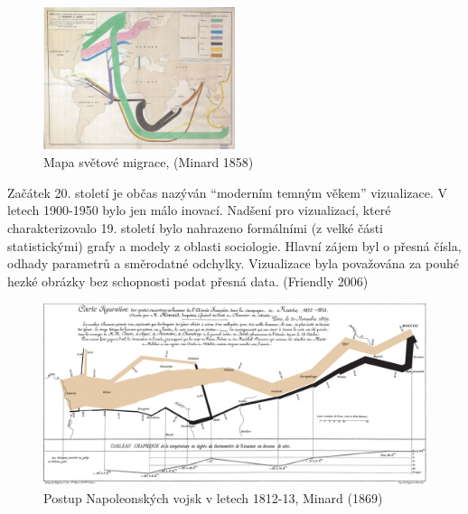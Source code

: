 \documentclass[12pt,]{article}
\begin{document}
\begin{figure}
    \centering
    \vspace*{-20pt}
    \includegraphics[width=0.5\textwidth]{fig/minard_flow_map.jpg}
    \vspace{-5pt}
    \caption{Mapa světové migrace, (Minard 1858)}
    \label{fig:ch1.2}
\end{figure}

\vspace{2.5pt} \qquad Začátek 20. století je občas nazýván
\enquote{moderním temným věkem} vizualizace. V letech 1900-1950 bylo jen
málo inovací. Nadšení pro vizualizací, které charakterizovalo 19.
století bylo nahrazeno formálními (z velké části statistickými) grafy a
modely z oblasti sociologie. Hlavní zájem byl o přesná čísla, odhady
parametrů a směrodatné odchylky. Vizualizace byla považována za pouhé
hezké obrázky bez schopnosti podat přesná data. (Friendly 2006)

\begin{figure}[H]
\centering
\includegraphics[width = \textwidth]{fig/Minard_1869}
\caption{Postup Napoleonských vojsk v letech 1812-13, Minard (1869)}
\label{fig:ch1.3}
\end{figure}
\end{document}
